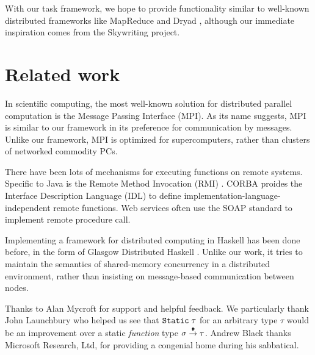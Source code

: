 \documentclass[preprint]{sigplanconf}
\begin{document}
With our task framework, we hope to provide functionality similar to well-known distributed frameworks like MapReduce \cite{MapReduce2008} and Dryad \cite{Dryad2007}, although our immediate inspiration comes from the Skywriting \cite{Murray2010}\cite{Murray2011} project.


\section{Related work}

In scientific computing, the most well-known solution for distributed parallel computation is the Message Passing Interface (MPI). As its name suggests, MPI is similar to our framework in its preference for communication by messages. Unlike our framework, MPI is optimized for supercomputers, rather than clusters of networked commodity PCs. 

There have been lots of mechanisms for executing functions on remote systems. Specific to Java is the Remote Method Invocation (RMI) \cite{javarmi}. CORBA proides the Interface Description Language (IDL) \cite{corbaidl} to define implementation-language-independent remote functions. Web services often use the SOAP standard to implement remote procedure call.

Implementing a framework for distributed computing in Haskell has been done before, in the form of Glasgow Distributed Haskell \cite{gdh2001}. Unlike our work, it tries to maintain the semantics of shared-memory concurrency in a distributed environment, rather than insisting on message-based communication between nodes.



\acks
Thanks to Alan Mycroft for support and helpful feedback. 
We particularly thank John Launchbury who helped us see that $\text{\tt Static}\;\tau$ for an arbitrary type $\tau$
would be an improvement over a static \emph{function} type 
$\sigma \stackrel{\texttt{\#}}{\rightarrow} \tau$.  Andrew Black thanks Microsoft Research, Ltd, for providing a congenial home during his sabbatical.





%
%
%
\end{document}
